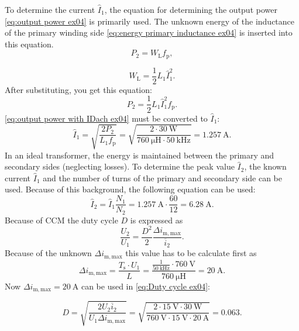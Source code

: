 \begin{solutionblock}
To determine the current  $\hat I_\mathrm{1}$, the equation for determining the output power \eqref{eq:output power ex04} is primarily used. The unknown energy of the inductance of the primary winding side \eqref{eq:energy primary inductance ex04} is inserted into this equation.
\begin{equation}
    P_\mathrm{2} = W_\mathrm{L} f_\mathrm{p}, \label{eq:output power ex04}
\end{equation}

\begin{equation}
    W_\mathrm{L} = \frac{1}{2}L_\mathrm{1}\hat I_\mathrm{1}^2. \label{eq:energy primary inductance ex04}
\end{equation}
After substituting, you get this equation:
\begin{equation}
    P_\mathrm{2} = \frac{1}{2}L_\mathrm{1}\hat I_\mathrm{1}^2 f_\mathrm{p}.\label{eq:output power with IDach ex04}
\end{equation}
\eqref{eq:output power with IDach ex04} must be converted to $\hat I_\mathrm{1}$:
\begin{equation}
    \hat I_\mathrm{1} = \sqrt{\frac{2P_\mathrm{2}}{L_\mathrm{1}f_\mathrm{p}}}= \sqrt{\frac{2\cdot\SI{30}{\watt}}{\SI{760}{\micro\henry}\cdot\SI{50}{\kilo\hertz}}}=\SI{1.257}{\ampere}.
\end{equation}
In an ideal transformer, the energy is maintained between the primary and secondary sides (neglecting losses). To determine the peak value $\hat I_\mathrm{2}$, the known current $\hat I_\mathrm{1}$ and the number of turns of the primary and secondary side can be used. Because of this background, the following equation can be used:
\begin{equation}
    \hat I_\mathrm{2} = \hat I_\mathrm{1} \frac{N_\mathrm{1}}{N_\mathrm{2}} = \SI{1.257}{\ampere} \cdot \frac{60}{12} = \SI{6.28}{\ampere}.
\end{equation}
Because of CCM the duty cycle $D$ is expressed as
\begin{equation}
    \frac{U_2}{U_1} = \frac{D^2}{2} \frac{\Delta i_\mathrm{m,max}}{\overline{i}_2}. \label{eq:Duty cycle ex04}
\end{equation}
Because of the unknown $\Delta i_\mathrm{m,max}$ this value has to be calculate first as
\begin{equation}
    \Delta i_\mathrm{m,max}= \frac{T_\mathrm{s} \cdot U_1}{L} = \frac{\frac{1}{\SI{50}{\kilo\hertz}}\cdot \SI{760}{\volt}}{\SI{760}{\micro\henry}}=\SI{20}{\ampere}.
\end{equation}
Now $\Delta i_\mathrm{m,max}=\SI{20}{\ampere}$ can be used in \eqref{eq:Duty cycle ex04}:

\begin{equation}
    D = \sqrt{\frac{2U_2\overline{i}_2}{U_1\Delta i_\mathrm{m,max}}} = \sqrt{\frac{2\cdot \SI{15}{\volt}\cdot\SI{30}{\watt}}{\SI{760}{\volt}\cdot\SI{15}{\volt}\cdot\SI{20}{\ampere}}} = 0.063.
\end{equation}

\end{solutionblock}

